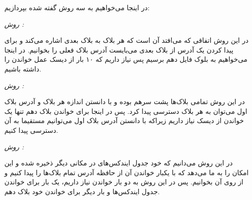 در اینجا می‌خواهیم به سه روش گفته شده بپردازیم:

\textit{روش :}

در این روش اتفاقی که می‌افتد آن است که هر بلاک به بلاک بعدی اشاره می‌کند و برای پیدا کردن یک آدرس از بلاک بعدی می‌بایست آدرس بلاک فعلی را بخوانیم. در اینجا می‌خواهیم به بلوک فایل دهم برسیم پس نیاز داریم که ۱۰ بار از دیسک عمل خواندن را داشته باشیم.

\textit{روش :}

در این روش تمامی بلاک‌ها پشت سرهم بوده و با دانستن اندازه هر بلاک و آدرس بلاک اول می‌توان به هر بلاک دسترسی پیدا کرد. پس در اینجا برای خواندن بلاک دهم تنها یک خواندن از دیسک نیاز داریم زیراکه با دانستن آدرس بلاک اول می‌توانیم مستقیما به آن دسترسی پیدا کنیم.

\textit{روش :}

در این روش می‌دانیم که خود جدول ایندکس‌های در مکانی دیگر ذخیره شده و این امکان را به ما می‌دهد که با یکبار خواندن آن از حافظه آدرس تمام بلاک‌ها را پیدا کنیم و از روی آن بخوانیم. پس در این روش به دو بار خواندن نیاز داریم، یک بار برای خواندن جدول ایندکس‌ها و بار دیگر برای خواندن خود بلاک دهم.